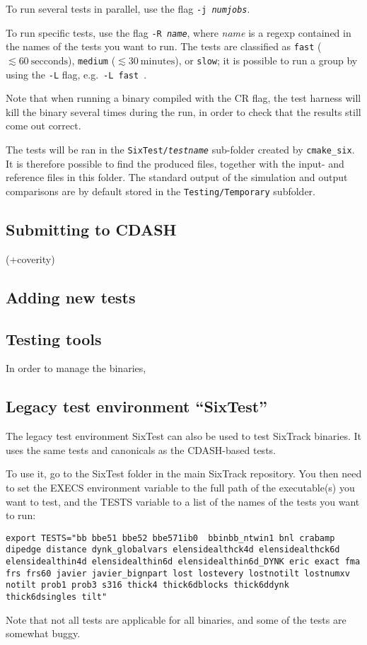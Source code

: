 \documentclass[english,BCOR=0mm,DIV=18]{scrartcl}
\begin{document}
To run several tests in parallel, use the flag \texttt{-j \textit{numjobs}}.

To run specific tests, use the flag \texttt{-R \textit{name}}, where \textit{name} is a regexp contained in the names of the tests you want to run.
The tests are classified as \texttt{fast} ($\lesssim 60~\mathrm{secconds}$), \texttt{medium} ($\lesssim 30~\mathrm{minutes}$), or \texttt{slow}; it is possible to run a group by using the \texttt{-L} flag, e.g.\ \texttt{-L fast}~.

Note that when running a binary compiled with the CR flag, the test harness will kill the binary several times during the run, in order to check that the results still come out correct.

The tests will be ran in the \texttt{SixTest/\textit{testname}} sub-folder created by \texttt{cmake\_six}.
It is therefore possible to find the produced files, together with the input- and reference files in this folder.
The standard output of the simulation and output comparisons are by default stored in the \texttt{Testing/Temporary} subfolder.

\subsection{Submitting to CDASH}

(+coverity)

\subsection{Adding new tests}

\subsection{Testing tools}
In order to manage the binaries, 

\subsection{Legacy test environment ``SixTest''}

The legacy test environment SixTest can also be used to test SixTrack binaries.
It uses the same tests and canonicals as the CDASH-based tests.

To use it, go to the SixTest folder in the main SixTrack repository.
You then need to set the EXECS environment variable to the full path of the executable(s) you want to test, and the TESTS variable to a list of the names of the tests you want to run:
\begin{lstlisting}
export TESTS="bb bbe51 bbe52 bbe571ib0  bbinbb_ntwin1 bnl crabamp dipedge distance dynk_globalvars elensidealthck4d elensidealthck6d elensidealthin4d elensidealthin6d elensidealthin6d_DYNK eric exact fma frs frs60 javier javier_bignpart lost lostevery lostnotilt lostnumxv notilt prob1 prob3 s316 thick4 thick6dblocks thick6ddynk thick6dsingles tilt"
\end{lstlisting}
Note that not all tests are applicable for all binaries, and some of the tests are somewhat buggy.
\end{document}
